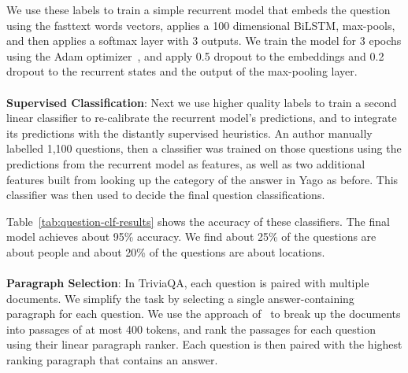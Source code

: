 \documentclass[11pt,a4paper]{article}
\begin{document}
We use these labels to train a simple recurrent model that embeds the question using the fasttext words vectors, applies a 100 dimensional BiLSTM, max-pools, and then applies a softmax layer with 3 outputs. We train the model for 3 epochs using the Adam optimizer~\cite{adam}, and apply 0.5 dropout to the embeddings and 0.2 dropout to the recurrent states and the output of the max-pooling layer.
\\
\\
\noindent \textbf{Supervised Classification}: Next we use higher quality labels to train a second linear classifier to re-calibrate the recurrent model's predictions, and to integrate its predictions with the distantly supervised heuristics. 
An author manually labelled 1,100 questions, then a classifier was trained on those questions using the predictions from the recurrent model as features, as well as two additional features built from looking up the category of the answer in Yago as before. This classifier was then used to decide the final question classifications.

Table~\ref{tab:question-clf-results} shows the accuracy of these classifiers. The final model achieves about 95\% accuracy. We find about 25\% of the questions are about people and about 20\% of the questions are about locations.
\\
\\
\noindent \textbf{Paragraph Selection}: In TriviaQA, each question is paired with multiple documents. We simplify the task by selecting a single answer-containing paragraph for each question. We use the approach of~\citet{clark2017simple} to break up the documents into passages of at most 400 tokens, and rank the passages for each question using their linear paragraph ranker. Each question is then paired with the highest ranking paragraph that contains an answer.

\label{sect:triviaqa-cp} 
\end{document}
